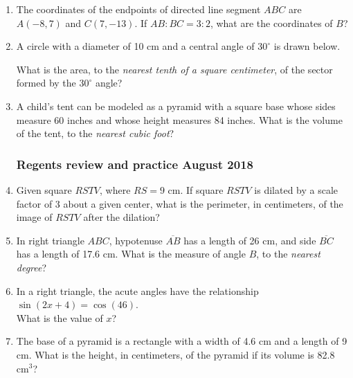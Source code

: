 \documentclass[12pt, oneside]{article}
\begin{document}
\begin{enumerate}[itemsep=0.5cm]
\item The coordinates of the endpoints of directed line segment $ABC$ are $A(-8,7)$ and $C(7,-13)$. If $AB:BC = 3:2$, what are the coordinates of $B$?

\item A circle with a diameter of 10 cm and a central angle of $30^\circ$ is drawn below.
\begin{center}
  \end{center}
  What is the area, to the \emph{nearest tenth of a square centimeter}, of the sector formed by the $30^\circ$ angle?

\item A child's tent can be modeled as a pyramid with a square base whose sides measure 60 inches and whose height measures 84 inches. What
is the volume of the tent, to the \emph{nearest cubic foot}?

\subsubsection*{Regents review and practice \hfill August 2018}
\item Given square $RSTV$, where $RS=9$ cm. If square $RSTV$ is dilated by a scale factor of 3 about a given center, what is the perimeter, in centimeters, of the image of $RSTV$ after the dilation?

\item In right triangle $ABC$, hypotenuse $\overline{AB}$ has a length of 26 cm, and side $\overline{BC}$ has a length of 17.6 cm. What is the measure of angle $B$, to the \emph{nearest degree}?

\item In a right triangle, the acute angles have the relationship \\$\sin (2x + 4)=\cos (46)$.\\[0.25cm]
What is the value of $x$?

\item The base of a pyramid is a rectangle with a width of 4.6 cm and a
length of 9 cm. What is the height, in centimeters, of the pyramid if
its volume is 82.8 cm$^3$?


\end{enumerate}
\end{document}
